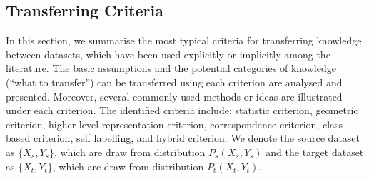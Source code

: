 \documentclass[prodmode]{acmsmall}  %
\begin{document}
\subsection{Transferring Criteria}
\label{sec:criteria}
In this section, we summarise the most typical criteria for transferring knowledge between datasets, which have been used explicitly or implicitly among the literature. The basic assumptions and the potential categories of knowledge (``what to transfer'') can be transferred using each criterion are analysed and presented. Moreover, several commonly used methods or ideas are illustrated under each criterion. The identified criteria include: statistic criterion, geometric criterion, higher-level representation criterion, correspondence criterion, class-based criterion, self labelling, and hybrid criterion.
We denote the source dataset as $\{X_s,Y_s\}$, which are draw from distribution $P_s(X_s,Y_s)$ and the target dataset as $\{X_t,Y_t\}$, which are draw from distribution $P_t(X_t,Y_t)$.
\end{document}
